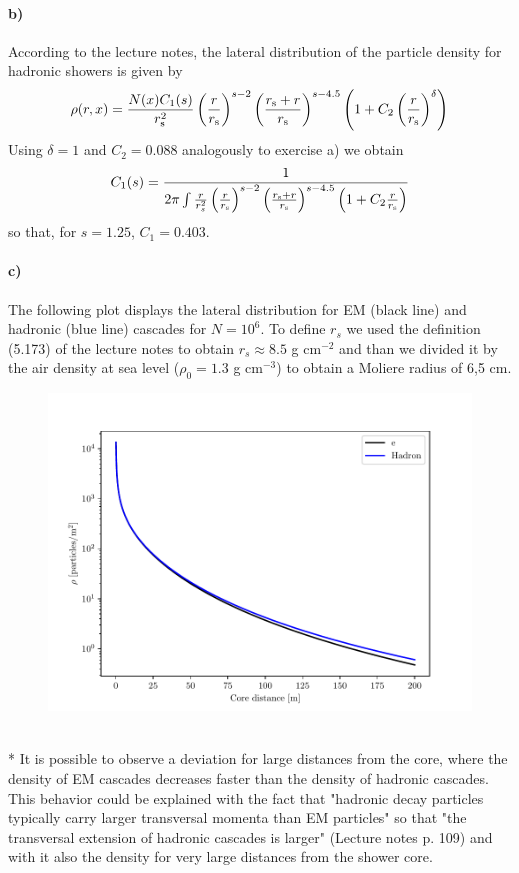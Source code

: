 \documentclass{article}
\begin{document}
\paragraph{b)}
According to the lecture notes, the lateral distribution of the particle density for hadronic showers is given by
\begin{align}
\rho(r,x)=\frac{N(x)C_1(s)}{r_{\rm s}^{2}}\left(\frac{r}{r_{\rm s}}\right)^{s-2}\left(\frac{r_{\rm s}+r}{r_{\rm s}}\right)^{s-4.5}\left(1+C_2\left(\frac{r}{r_{\rm s}}\right)^{\delta}\right)
\end{align}
Using $\delta=1$ and $C_2=0.088$ analogously to exercise a) we obtain
\begin{align}
C_1(s)=\frac{1}{2\pi\int\frac{r}{r_{s}^{2}}\left(\frac{r}{r_{\rm s}}\right)^{s-2}\left(\frac{r_{\rm s}+r}{r_{\rm s}}\right)^{s-4.5}\left(1+C_2\frac{r}{r_{\rm s}}\right)}
\end{align}
so that, for $s=1.25$, $C_1=0.403$.

\paragraph{c)}
The following plot displays the lateral distribution for EM (black line) and hadronic (blue line) cascades for $N=10^6$. To define $r_s$ we used the definition (5.173) of the lecture notes to obtain $r_s\approx 8.5$ g cm$^{-2}$ and than we divided it by the air density at sea level ($\rho_0=1.3$ g cm$^{-3}$) to obtain a Moliere radius of 6,5 cm.
\begin{figure}[h]
\centering
\includegraphics[height=6 cm, width= 8 cm]{plot_ex_2c.pdf}
\label{plot_ex_2c}
\end{figure}
\\* It is possible to observe a deviation for large distances from the core, where the density of EM cascades decreases faster than the density of hadronic cascades. This behavior could be explained with the fact that "hadronic decay particles typically carry larger transversal momenta than EM particles" so that "the transversal extension of hadronic cascades is larger" (Lecture notes p. 109) and with it also the density for very large distances from the shower core. 
\end{document}
